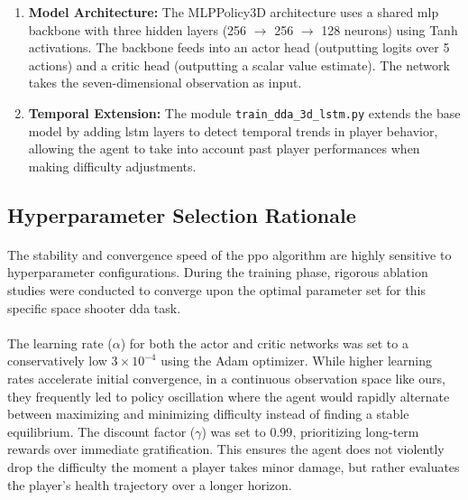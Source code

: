 \begin{enumerate}
	\item \textbf{Model Architecture:} The MLPPolicy3D architecture uses a shared \ac{mlp} backbone with three hidden layers (256 $\rightarrow$ 256 $\rightarrow$ 128 neurons) using Tanh activations. The backbone feeds into an actor head (outputting logits over 5 actions) and a critic head (outputting a scalar value estimate). The network takes the seven-dimensional observation as input.
	
	\item \textbf{Temporal Extension:} The module \texttt{train\_dda\_3d\_lstm.py} extends the base model by adding \ac{lstm} layers to detect temporal trends in player behavior, allowing the agent to take into account past player performances when making difficulty adjustments.
\end{enumerate}

\subsection{Hyperparameter Selection Rationale}
\paragraph{} The stability and convergence speed of the \ac{ppo} algorithm are highly sensitive to hyperparameter configurations. During the training phase, rigorous ablation studies were conducted to converge upon the optimal parameter set for this specific space shooter \ac{dda} task.
\paragraph{} The learning rate ($\alpha$) for both the actor and critic networks was set to a conservatively low $3 \times 10^{-4}$ using the Adam optimizer. While higher learning rates accelerate initial convergence, in a continuous observation space like ours, they frequently led to policy oscillation where the agent would rapidly alternate between maximizing and minimizing difficulty instead of finding a stable equilibrium. The discount factor ($\gamma$) was set to $0.99$, prioritizing long-term rewards over immediate gratification. This ensures the agent does not violently drop the difficulty the moment a player takes minor damage, but rather evaluates the player's health trajectory over a longer horizon.
